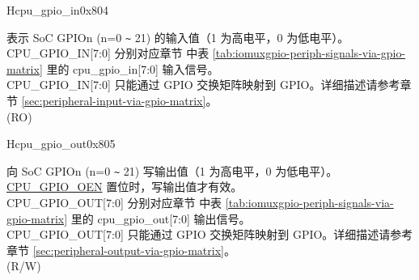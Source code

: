 \begin{register}{H}{cpu\_gpio\_in}{0x804}\label{regdesc:GPIO_IN}
%
%
%
%
%
%
%
%
%
\regnewline%
\begin{regdesc}\begin{reglist}
\label{fielddesc:GPIO_IN}\item [CPU\_GPIO\_IN] 表示 SoC GPIOn (n=0 \verb+~+ 21) 的输入值（1 为高电平，0 为低电平）。\\
CPU\_GPIO\_IN[7:0] 分别对应章节 \textit{} 中表 \ref{tab:iomuxgpio-periph-signals-via-gpio-matrix} 里的 cpu\_gpio\_in[7:0] 输入信号。\\
CPU\_GPIO\_IN[7:0] 只能通过 GPIO 交换矩阵映射到 GPIO。详细描述请参考章节 \ref{sec:peripheral-input-via-gpio-matrix}。
\\
(RO) 
\end{reglist}\end{regdesc}
\end{register}
\begin{register}{H}{cpu\_gpio\_out}{0x805}\label{regdesc:GPIO_OUT}
%
%
%
%
%
%
%
%
%
\regnewline%
\begin{regdesc}\begin{reglist}
\label{fielddesc:GPIO_OUT}\item [CPU\_GPIO\_OUT] 向 SoC GPIOn (n=0 \verb+~+ 21) 写输出值（1 为高电平，0 为低电平）。\hyperref[fielddesc:GPIO_OEN]{CPU\_GPIO\_OEN} 置位时，写输出值才有效。\\
CPU\_GPIO\_OUT[7:0] 分别对应章节 \textit{} 中表 \ref{tab:iomuxgpio-periph-signals-via-gpio-matrix} 里的 cpu\_gpio\_out[7:0] 输出信号。\\
CPU\_GPIO\_OUT[7:0] 只能通过 GPIO 交换矩阵映射到 GPIO。详细描述请参考章节 \ref{sec:peripheral-output-via-gpio-matrix}。
\\
(R/W)
\end{reglist}\end{regdesc}
\end{register}
